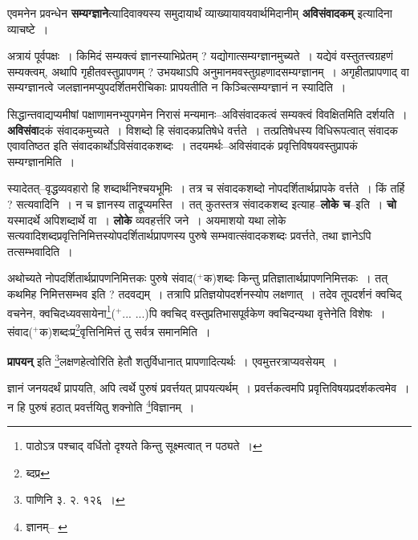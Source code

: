 \documentclass[article,12pt,a4paper]{memoir}
\newcommand{\add}[1]{($^{+}$#1)}
\begin{document}
	  \endgroup
	

	  \pstart एवमनेन प्रवन्धेन \textbf{सम्यग्ज्ञाने}त्यादिवाक्यस्य समुदायार्थं व्याख्यायावयवार्थमिदानीम् \textbf{अविसंवादकम्} इत्यादिना व्याचष्टे ।
	\pend
      

	  \pstart अत्रायं पूर्वपक्षः । किमिदं सम्यक्त्वं ज्ञानस्याभिप्रेतम् ? यद्योगात्सम्यग्ज्ञानमुच्यते । यद्येवं वस्तुतत्त्वग्रहणं सम्यक्त्वम्, अथापि गृहीतवस्तुप्रापणम् ? उभयथाऽपि अनुमानमवस्तुग्रहणादसम्यग्ज्ञानम् । अगृहीतप्रापणाद् वा सम्यग्ज्ञानत्वे जलज्ञानमप्युपदर्शितमरीचिकाः प्रापयतीति न किञ्चित्सम्यग्ज्ञानं न स्यादिति ।
	\pend
      

	  \pstart सिद्धान्तवाद्यप्यमीषां पक्षाणामनभ्युपगमेन निरासं मन्यमानः--अविसंवादकत्वं सम्यक्त्वं विवक्षितमिति \leavevmode{} दर्शयति । \textbf{अविसंवा}दकं संवादकमुच्यते । विशब्दो हि संवादकप्रतिषेधे वर्त्तते । तत्प्रतिषेधस्य विधिरूपत्वात् संवादक एवावतिष्ठत इति संवादकार्थोऽविसंवादकशब्दः । तदयमर्थः--अविसंवादकं प्रवृत्तिविषयवस्तुप्रापकं सम्यग्ज्ञानमिति ।
	\pend
      

	  \pstart स्यादेतत्--वृद्धव्यवहारो हि शब्दार्थनिश्चयभूमिः । तत्र च संवादकशब्दो नोपदर्शितार्थप्रापके वर्त्तते । किं तर्हि ? सत्यवादिनि । न च ज्ञानस्य ताद्रूप्यमस्ति । तत् कुतस्तत्र संवादकशब्द इत्याह--\textbf{लोके च}--इति । \textbf{चो} यस्मादर्थे अपिशब्दार्थे वा । \textbf{लोके} व्यवहर्त्तरि जने । अयमाशयो यथा लोके सत्यवादिशब्दप्रवृत्तिनिमित्तस्योपदर्शितार्थप्रापणस्य पुरुषे सम्भवात्संवादकशब्दः प्रवर्त्तते, तथा ज्ञानेऽपि तत्सम्भवादिति ।
	\pend
      

	  \pstart अथोच्यते नोपदर्शितार्थप्रापणनिमित्तकः पुरुषे संवाद\add{क}शब्दः किन्तु प्रतिज्ञातार्थप्रापणनिमित्तकः । तत् कथमिह निमित्तसम्भव इति ? तदवद्यम् । तत्रापि प्रतिज्ञयोपदर्शनस्योप लक्षणात् । तदेव तूपदर्शनं क्वचिद् वचनेन, क्वचिदध्यवसायेना\footnote{पाठोऽत्र पश्चाद् वर्धितो दृश्यते किन्तु सूक्ष्मत्वात् न पठ्यते ।}\add{... ...}पि क्वचिद् वस्तुप्रतिभासपूर्वकेण क्वचिदन्यथा वृत्तेनेति विशेषः । संवाद\add{क}शब्दःप्र\footnote{ब्दप्र}\-वृत्तिनिमित्तं तु सर्वत्र समानमिति ।
	\pend
      

	  \pstart \textbf{प्रापयन्} इति \footnote{पाणिनि ३. २. १२६ ।}\-लक्षणहेत्वोरिति हेतौ शतुर्विधानात् प्रापणादित्यर्थः । एवमुत्तरत्राप्यवसेयम् ।
	\pend
	  \bigskip
	  \begingroup
	

	  \pstart ज्ञानं जनयदर्थं प्रापयति, अपि त्वर्थे पुरुषं प्रवर्त्तयत् प्रापयत्यर्थम् । प्रवर्त्तकत्वमपि प्रवृत्तिविषयप्रदर्शकत्वमेव । न हि पुरुषं हठात् प्रवर्त्तयितु शक्नोति \footnote{ज्ञानम्--\cite{dp-msB} \cite{dp-edN}}\-विज्ञानम् ।
	\pend
      
\end{document}
